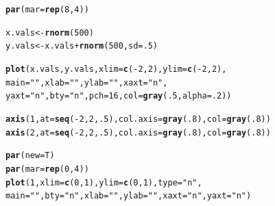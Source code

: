 \documentclass{tufte-book}\usepackage[]{graphicx}\usepackage[]{color}
\makeatletter
\newcommand{\hlnum}[1]{\textcolor[rgb]{0.686,0.059,0.569}{#1}}%
\newcommand{\hlstr}[1]{\textcolor[rgb]{0.192,0.494,0.8}{#1}}%
\newcommand{\hlopt}[1]{\textcolor[rgb]{0,0,0}{#1}}%
\newcommand{\hlstd}[1]{\textcolor[rgb]{0.345,0.345,0.345}{#1}}%
\newcommand{\hlkwb}[1]{\textcolor[rgb]{0.69,0.353,0.396}{#1}}%
\newcommand{\hlkwc}[1]{\textcolor[rgb]{0.333,0.667,0.333}{#1}}%
\newcommand{\hlkwd}[1]{\textcolor[rgb]{0.737,0.353,0.396}{\textbf{#1}}}%
\newenvironment{kframe}{%
 \def\at@end@of@kframe{}%
 \ifinner\ifhmode%
  \def\at@end@of@kframe{\end{minipage}}%
  \begin{minipage}{\columnwidth}%
 \fi\fi%
 \def\FrameCommand##1{\hskip\@totalleftmargin \hskip-\fboxsep
 \colorbox{shadecolor}{##1}\hskip-\fboxsep
     \hskip-\linewidth \hskip-\@totalleftmargin \hskip\columnwidth}%
 \MakeFramed {\advance\hsize-\width
   \@totalleftmargin\z@ \linewidth\hsize
   \@setminipage}}%
 {\par\unskip\endMakeFramed%
 \at@end@of@kframe}
\newenvironment{knitrout}{}{} %
\makeatother
\begin{document}
\begin{footnotesize}
\begin{marginfigure}
\begin{tiny}
\begin{knitrout}
\color{fgcolor}\begin{kframe}
\begin{alltt}
\hlkwd{par}\hlstd{(}\hlkwc{mar} \hlstd{=} \hlkwd{rep}\hlstd{(}\hlnum{8}\hlstd{,} \hlnum{4}\hlstd{))}

\hlstd{x.vals} \hlkwb{<-} \hlkwd{rnorm}\hlstd{(}\hlnum{500}\hlstd{)}
\hlstd{y.vals} \hlkwb{<-} \hlstd{x.vals} \hlopt{+} \hlkwd{rnorm}\hlstd{(}\hlnum{500}\hlstd{,} \hlkwc{sd} \hlstd{=} \hlnum{.5}\hlstd{)}

\hlkwd{plot}\hlstd{(x.vals, y.vals,} \hlkwc{xlim} \hlstd{=} \hlkwd{c}\hlstd{(}\hlopt{-}\hlnum{2}\hlstd{,} \hlnum{2}\hlstd{),} \hlkwc{ylim} \hlstd{=} \hlkwd{c}\hlstd{(}\hlopt{-}\hlnum{2}\hlstd{,} \hlnum{2}\hlstd{),}
     \hlkwc{main} \hlstd{=} \hlstr{""}\hlstd{,} \hlkwc{xlab} \hlstd{=} \hlstr{""}\hlstd{,} \hlkwc{ylab} \hlstd{=} \hlstr{""}\hlstd{,} \hlkwc{xaxt} \hlstd{=} \hlstr{"n"}\hlstd{,}
     \hlkwc{yaxt} \hlstd{=} \hlstr{"n"}\hlstd{,} \hlkwc{bty} \hlstd{=} \hlstr{"n"}\hlstd{,} \hlkwc{pch} \hlstd{=} \hlnum{16}\hlstd{,} \hlkwc{col} \hlstd{=} \hlkwd{gray}\hlstd{(}\hlnum{.5}\hlstd{,} \hlkwc{alpha} \hlstd{=} \hlnum{.2}\hlstd{))}

\hlkwd{axis}\hlstd{(}\hlnum{1}\hlstd{,} \hlkwc{at} \hlstd{=} \hlkwd{seq}\hlstd{(}\hlopt{-}\hlnum{2}\hlstd{,} \hlnum{2}\hlstd{,} \hlnum{.5}\hlstd{),} \hlkwc{col.axis} \hlstd{=} \hlkwd{gray}\hlstd{(}\hlnum{.8}\hlstd{),} \hlkwc{col} \hlstd{=} \hlkwd{gray}\hlstd{(}\hlnum{.8}\hlstd{))}
\hlkwd{axis}\hlstd{(}\hlnum{2}\hlstd{,} \hlkwc{at} \hlstd{=} \hlkwd{seq}\hlstd{(}\hlopt{-}\hlnum{2}\hlstd{,} \hlnum{2}\hlstd{,} \hlnum{.5}\hlstd{),} \hlkwc{col.axis} \hlstd{=} \hlkwd{gray}\hlstd{(}\hlnum{.8}\hlstd{),} \hlkwc{col} \hlstd{=} \hlkwd{gray}\hlstd{(}\hlnum{.8}\hlstd{))}

\hlkwd{par}\hlstd{(}\hlkwc{new} \hlstd{= T)}
\hlkwd{par}\hlstd{(}\hlkwc{mar} \hlstd{=} \hlkwd{rep}\hlstd{(}\hlnum{0}\hlstd{,} \hlnum{4}\hlstd{))}
\hlkwd{plot}\hlstd{(}\hlnum{1}\hlstd{,} \hlkwc{xlim} \hlstd{=} \hlkwd{c}\hlstd{(}\hlnum{0}\hlstd{,} \hlnum{1}\hlstd{),} \hlkwc{ylim} \hlstd{=} \hlkwd{c}\hlstd{(}\hlnum{0}\hlstd{,} \hlnum{1}\hlstd{),} \hlkwc{type} \hlstd{=}\hlstr{"n"}\hlstd{,}
     \hlkwc{main} \hlstd{=} \hlstr{""}\hlstd{,} \hlkwc{bty} \hlstd{=} \hlstr{"n"}\hlstd{,} \hlkwc{xlab} \hlstd{=} \hlstr{""}\hlstd{,} \hlkwc{ylab} \hlstd{=} \hlstr{""}\hlstd{,} \hlkwc{xaxt} \hlstd{=} \hlstr{"n"}\hlstd{,} \hlkwc{yaxt} \hlstd{=} \hlstr{"n"}\hlstd{)}


\end{alltt}
\end{kframe}
\end{knitrout}
\end{tiny}
\end{marginfigure}
\end{footnotesize}
\end{document}
